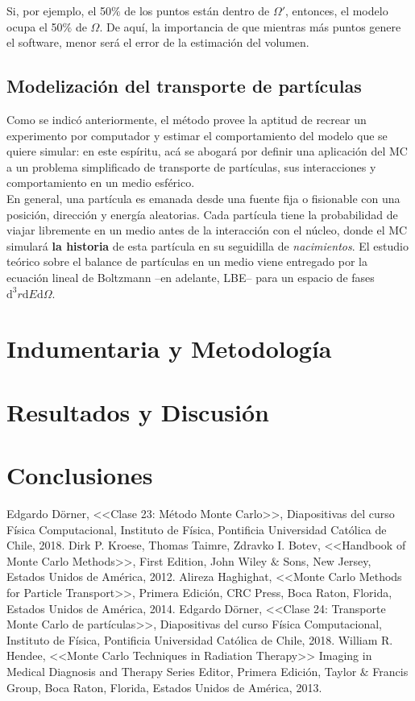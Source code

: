 \documentclass[12pt]{article}
\begin{document}
Si, por ejemplo, el 50$\%$ de los puntos están dentro de $\Omega'$, entonces, el modelo ocupa el 50$\%$ de $\Omega$. De aquí, la importancia de que mientras más puntos genere el software, menor será el error de la estimación del volumen.

\subsection{Modelización del transporte de partículas}
Como se indicó anteriormente, el método provee la aptitud de recrear un experimento por computador y estimar el comportamiento del modelo que se quiere simular: en este espíritu, acá se abogará por definir una aplicación del MC a un problema simplificado de transporte de partículas, sus interacciones y comportamiento en un medio esférico. \\

En general, una partícula es emanada desde una fuente fija o fisionable con una posición, dirección y energía aleatorias. Cada partícula tiene la probabilidad de viajar libremente en un medio antes de la interacción con el núcleo, donde el MC simulará \textbf{la historia} de esta partícula en su seguidilla de \emph{nacimientos}. El estudio teórico sobre el balance de partículas en un medio viene entregado por la ecuación lineal de Boltzmann --en adelante, LBE-- para un espacio de fases $\text{d}^3r \text{d}E \text{d}\Omega$. 



\section{Indumentaria y Metodología}
\section{Resultados y Discusión}
\section{Conclusiones}


\begin{thebibliography}{0}
 Edgardo Dörner, <<Clase 23: Método Monte Carlo>>, Diapositivas del curso Física Computacional, Instituto de Física, Pontificia Universidad Católica de Chile, 2018.
 Dirk P. Kroese, Thomas Taimre, Zdravko I. Botev, <<Handbook of Monte Carlo Methods>>, First Edition, John Wiley $\&$ Sons, New Jersey, Estados Unidos de América, 2012.
 Alireza Haghighat, <<Monte Carlo Methods for Particle Transport>>, Primera Edición, CRC Press, Boca Raton, Florida, Estados Unidos de América, 2014.
 Edgardo Dörner, <<Clase 24: Transporte Monte Carlo de partículas>>, Diapositivas del curso Física Computacional, Instituto de Física, Pontificia Universidad Católica de Chile, 2018.
 William R. Hendee, <<Monte Carlo Techniques in Radiation Therapy>> Imaging in Medical Diagnosis and Therapy Series Editor, Primera Edición, Taylor $\&$ Francis Group, Boca Raton, Florida, Estados Unidos de América, 2013. 
\end{thebibliography}
\end{document}
